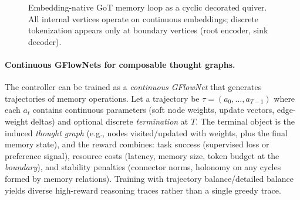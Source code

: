 \documentclass[11pt]{article}
\theoremstyle{definition}
\theoremstyle{plain}
\theoremstyle{remark}
\newcommand{\mc}[1]{\mathcal{#1}}
\newcommand{\Emb}{\mc{E}}
\begin{document}
\begin{figure}[t]
\centering
{}
\caption{Embedding-native GoT memory loop as a cyclic decorated quiver.
All internal vertices operate on continuous embeddings; discrete tokenization appears only at boundary vertices (root encoder, sink decoder).}
\label{fig:got}
\end{figure}

\paragraph{Continuous GFlowNets for composable thought graphs.}
The controller can be trained as a \emph{continuous GFlowNet} that generates trajectories of memory operations.
Let a trajectory be $\tau=(a_0,\dots,a_{T-1})$ where each $a_t$ contains continuous parameters (soft node weights, update vectors, edge-weight deltas) and optional discrete \emph{termination} at $T$.
The terminal object is the induced \emph{thought graph} (e.g., nodes visited/updated with weights, plus the final memory state), and the reward combines:
task success (supervised loss or preference signal),
resource costs (latency, memory size, token budget at the \emph{boundary}),
and stability penalties (connector norms, holonomy on any cycles formed by memory relations).
Training with trajectory balance/detailed balance yields diverse high-reward reasoning traces rather than a single greedy trace.
\end{document}
